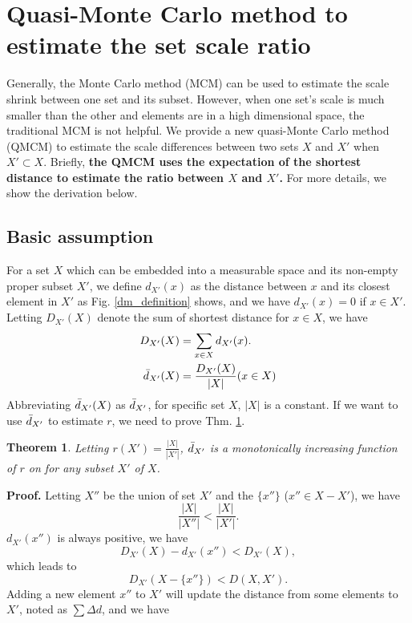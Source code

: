 \documentclass[letterpaper]{article} %
\newtheorem{theorem}{Theorem}
\begin{document}
\section{Quasi-Monte Carlo method to estimate the set scale ratio}
Generally, the Monte Carlo method \cite{kroese2014monte} (MCM) can be used to estimate the scale shrink between one set and its subset. However, when one set's scale is much smaller than the other and elements are in a high dimensional space, the traditional MCM is not helpful. We provide a new quasi-Monte Carlo method (QMCM) to estimate the scale differences between two sets $ X $ and $X'$ when $X' \subset X$. Briefly, \textbf{the QMCM uses the expectation of the shortest distance to estimate the ratio between $X$ and $X'$.} For more details, we show the derivation below.

\subsection{Basic assumption}
For a set $X$ which can be embedded into a measurable space and its non-empty proper subset $X'$, we define $d_{X'}(x)$ as the distance between $x$ and its closest element in $X'$ as Fig. \ref{dm_definition} shows, and we have $d_{X'}(x) = 0$ if $x \in X'$. Letting $D_{X'}(X)$ denote the sum of shortest distance for $x \in X$, we have
\begin{align*}
    D_{X'}(X) &= \sum_{x\in X}d_{X'}(x). \\
    \Bar{d}_{X'}(X) &= \frac{D_{X'}(X)}{|X|}(x \in X)
\end{align*}
Abbreviating $\Bar{d}_{X'}(X) $ as $\Bar{d}_{X'}$, for specific set $X$, $|X|$ is a constant.
If we want to use $\Bar{d}_{X'}$ to estimate $r$, we need to prove Thm. \ref{estimate_distance}.

\begin{theorem}
    Letting $r(X') = \frac{|X|}{|X'|}$, $\Bar{d}_{X'}$ is a monotonically increasing function of $r$ on for any subset $X'$ of $X$.
    \label{estimate_distance}
\end{theorem}

\textbf{Proof.} Letting $X''$ be the union of set $X'$ and the $\{x''\}$ ($x''\in X-X'$), we have
\begin{equation*}
    \frac{|X|}{|X''|}  < \frac{|X|}{|X'|}.
\end{equation*}
$d_{X'}(x'')$ is always positive, we have
\begin{equation*}
    D_{X'}(X) - d_{X'}(x'') < D_{X'}(X),
\end{equation*}
which leads to
\begin{equation*}
    D_{X'}(X-\{x''\}) < D(X,X').
\end{equation*}
Adding a new element $x''$ to $X'$ will update the distance from some elements to $X'$, noted as $\sum \Delta d$, and we have
\end{document}
